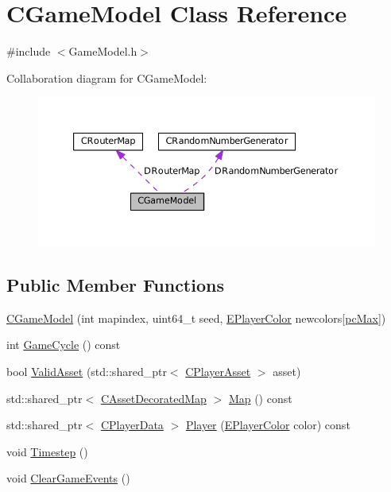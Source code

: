 \hypertarget{classCGameModel}{}\section{C\+Game\+Model Class Reference}
\label{classCGameModel}


{\ttfamily \#include $<$Game\+Model.\+h$>$}



Collaboration diagram for C\+Game\+Model\+:
\nopagebreak
\begin{figure}[H]
\begin{center}
\leavevmode
\includegraphics[width=350pt]{classCGameModel__coll__graph}
\end{center}
\end{figure}
\subsection*{Public Member Functions}
\begin{DoxyCompactItemize}
\item 
\hyperlink{classCGameModel_a37858821d1294b21b374cf4f81052f3e}{C\+Game\+Model} (int mapindex, uint64\+\_\+t seed, \hyperlink{GameDataTypes_8h_aafb0ca75933357ff28a6d7efbdd7602f}{E\+Player\+Color} newcolors\mbox{[}\hyperlink{GameDataTypes_8h_aafb0ca75933357ff28a6d7efbdd7602fa594a5c8dd3987f24e8a0f23f1a72cd34}{pc\+Max}\mbox{]})
\item 
int \hyperlink{classCGameModel_af27947dce7cc0fa2dc9ec81872e26264}{Game\+Cycle} () const
\item 
bool \hyperlink{classCGameModel_a5e6e46dd32a655e2a4432aeb134cc7e3}{Valid\+Asset} (std\+::shared\+\_\+ptr$<$ \hyperlink{classCPlayerAsset}{C\+Player\+Asset} $>$ asset)
\item 
std\+::shared\+\_\+ptr$<$ \hyperlink{classCAssetDecoratedMap}{C\+Asset\+Decorated\+Map} $>$ \hyperlink{classCGameModel_a7b95d8fb5d96d3dd9ad3596e1a90f6a3}{Map} () const
\item 
std\+::shared\+\_\+ptr$<$ \hyperlink{classCPlayerData}{C\+Player\+Data} $>$ \hyperlink{classCGameModel_ad9c8def41d5369661fab971b9a4fe786}{Player} (\hyperlink{GameDataTypes_8h_aafb0ca75933357ff28a6d7efbdd7602f}{E\+Player\+Color} color) const
\item 
void \hyperlink{classCGameModel_a699325d41d7ff27bda47bfb3048cfd8f}{Timestep} ()
\item 
void \hyperlink{classCGameModel_a7591a4e79f91a048462bce532fd4eca1}{Clear\+Game\+Events} ()
\end{DoxyCompactItemize}
